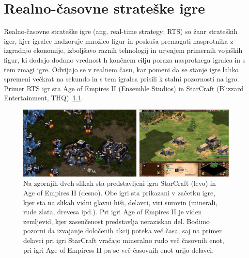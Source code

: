 \documentclass[a4paper, 12pt]{book}
\begin{document}
\chapter{Realno-časovne strateške igre}
\label{chrts}

Realno-časovne strateške igre (ang. real-time strategy; RTS) so žanr strateških iger, kjer igralec nadzoruje množico figur in poskuša premagati nasprotnika z izgradnjo ekonomije, izboljšavo raznih tehnologij in urjenjem primernih vojaških figur, ki dodajo dodano vrednost h končnem cilju poraza nasprotnega igralca in s tem zmagi igre.
Odvijajo se v realnem času, kar pomeni da se stanje igre lahko spremeni večkrat na sekundo in s tem igralca prisili k stalni pozornosti na igro.
Primer RTS igr sta Age of Empires II (Ensemble Studios) in StarCraft (Blizzard Entertainment, THQ)~\ref{picRtsGames}. 

\begin{figure}[h!]
	\begin{center}
		\includegraphics[width=1.0\textwidth]{photos/horizontal_rts.pdf}
	\end{center}
	\caption{Na zgornjih dveh slikah sta predstavljeni igra StarCraft (levo) in Age of Empires II (desno). Obe igri sta prikazani v začetku igre, kjer sta na slikah vidni glavni hiši, delavci, viri surovin (minerali, rude zlata, drevesa ipd.). Pri igri Age of Empires II je viden zemljevid, kjer zasenčenost predstavlja neraziskan del. Bodimo pozorni da izvajanje določenih akcij poteka več časa, saj na primer delavci pri igri StarCraft vračajo mineralno rudo več časovnih enot, pri igri Age of Empiress II pa se več časovnih enot urijo delavci.}
	\label{picRtsGames}
\end{figure}
\end{document}
